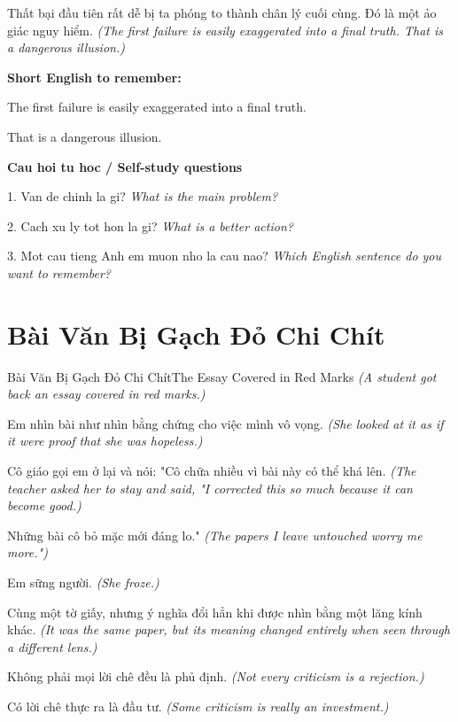 \begin{baihoc}
Thất bại đầu tiên rất dễ bị ta phóng to thành chân lý cuối cùng. Đó là một ảo giác nguy hiểm.
\textit{(The first failure is easily exaggerated into a final truth. That is a dangerous illusion.)}
\end{baihoc}

\begin{ghinhoanh}
\textbf{Short English to remember:}

The first failure is easily exaggerated into a final truth.

That is a dangerous illusion.

\end{ghinhoanh}

\begin{tuhocnhanh}
\textbf{Cau hoi tu hoc / Self-study questions}

1. Van de chinh la gi? \textit{What is the main problem?}

2. Cach xu ly tot hon la gi? \textit{What is a better action?}

3. Mot cau tieng Anh em muon nho la cau nao? \textit{Which English sentence do you want to remember?}
\end{tuhocnhanh}
\ngancach

\section{Bài Văn Bị Gạch Đỏ Chi Chít}
\begin{truyen}{Bài Văn Bị Gạch Đỏ Chi Chít}{The Essay Covered in Red Marks}
\textit{(A student got back an essay covered in red marks.)}

Em nhìn bài như nhìn bằng chứng cho việc mình vô vọng.
\textit{(She looked at it as if it were proof that she was hopeless.)}

Cô giáo gọi em ở lại và nói: "Cô chữa nhiều vì bài này có thể khá lên.
\textit{(The teacher asked her to stay and said, "I corrected this so much because it can become good.)}

Những bài cô bỏ mặc mới đáng lo."
\textit{(The papers I leave untouched worry me more.")}

Em sững người.
\textit{(She froze.)}

Cùng một tờ giấy, nhưng ý nghĩa đổi hẳn khi được nhìn bằng một lăng kính khác.
\textit{(It was the same paper, but its meaning changed entirely when seen through a different lens.)}

Không phải mọi lời chê đều là phủ định.
\textit{(Not every criticism is a rejection.)}

Có lời chê thực ra là đầu tư.
\textit{(Some criticism is really an investment.)}

\end{truyen}

